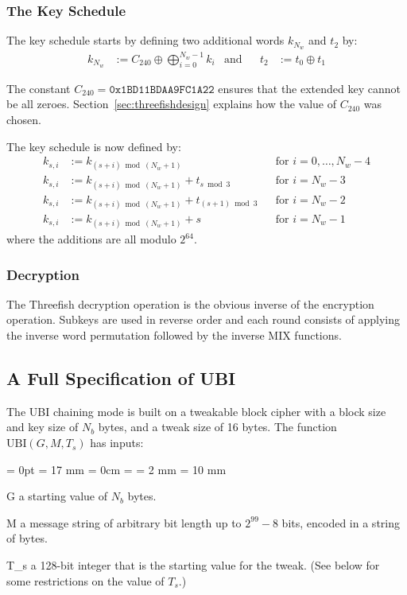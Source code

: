 \documentclass[11pt,twoside]{article}
\newcommand{\xor}{\oplus}
\newcommand{\TheConst}{C_{240}} %
\def\symdef#1{\label{symdef:#1}}
\newcommand{\UBI}{\text{UBI}}
\newcommand{\parameterlabel}[1]{$#1$\hfill}
\newenvironment{parameters}{\begin{list}{?}{%
\parsep = 0pt
\leftmargin = 17 mm
\rightmargin = 0cm
\listparindent = \parindent
\labelsep = 2 mm
\labelwidth = 10 mm
\let\makelabel\parameterlabel
}%
}{\end{list}}
\begin{document}
\subsubsection{The Key Schedule}\label{sec:keyschedule}

The key schedule starts by defining two additional words $k_{N_w}$ and $t_2$ by:
\begin{align*}
k_{N_w} &:= \TheConst \xor \bigoplus_{i=0}^{N_w-1} k_i  &\text{and}&&
t_2 &:= t_0 \xor t_1
\end{align*}

The constant $\TheConst=\texttt{0x1BD11BDAA9FC1A22}$ ensures that the extended
key cannot be all zeroes. Section~\ref{sec:threefishdesign} explains
how the value of $\TheConst$ was chosen.

The key schedule is now defined by: \symdef{k_si}
\begin{align*}
  k_{s,i} &:= k_{(s+i) \bmod (N_w+1)}                     &&\text{for $i=0,\ldots,N_w - 4$}\\
  k_{s,i} &:= k_{(s+i) \bmod (N_w+1)} + t_{s \bmod 3}     &&\text{for $i=N_w-3$}\\
  k_{s,i} &:= k_{(s+i) \bmod (N_w+1)} + t_{(s+1) \bmod 3} &&\text{for $i=N_w-2$}\\
  k_{s,i} &:= k_{(s+i) \bmod (N_w+1)} + s                 &&\text{for $i=N_w-1$}
\end{align*}
where the additions are all modulo $2^{64}$.

\subsubsection{Decryption}

The Threefish decryption operation is the obvious inverse of the encryption operation. Subkeys are used in reverse order and each round consists of applying the inverse word permutation followed by the inverse MIX functions.

\subsection{A Full Specification of UBI}

The UBI chaining mode is built on a tweakable block cipher with a block size and key size of $N_b$ bytes\symdef{N_b}, and a tweak size of 16 bytes. The function $\UBI(G, M, T_s)$ has inputs:
\begin{parameters}
    \item[G] a starting value of $N_b$ bytes.
    \item[M] a message string of arbitrary bit length up to $2^{99}-8$ bits, encoded in a string of bytes.
    \item[T_s] a 128-bit integer that is the starting value for the tweak. (See below for some restrictions on the value of $T_s$.)\symdef{T_s}
\end{parameters}
\end{document}
